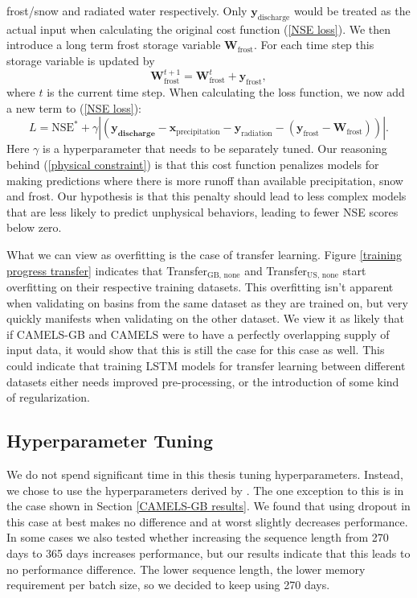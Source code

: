 frost/snow and radiated water respectively. Only $\bm{y}_\text{discharge}$ would 
be treated as the actual input when calculating the original cost function 
(\ref{NSE loss}). We then introduce a long term frost storage variable $\bm{W}_\text{frost}$.
For each time step this storage variable is updated by 
\begin{equation}
    \bm{W}_\text{frost}^{t+1} = \bm{W}_\text{frost}^t + \bm{y}_\text{frost},
\end{equation}
where $t$ is the current time step.
When calculating the loss function, we now add a new term to (\ref{NSE loss}):
\begin{equation}
    L = \text{NSE}^* + \gamma \left|(\bm{y_\text{discharge}} - \bm{x}_\text{precipitation} 
    - \bm{y}_\text{radiation} - (\bm{y}_\text{frost} - \bm{W}_\text{frost}))\right|
    \label{physical constraint}.
\end{equation}
Here $\gamma$ is a hyperparameter that needs to be separately tuned. Our reasoning 
behind (\ref{physical constraint}) is that this cost function penalizes models for 
making predictions where there is more runoff than available precipitation, 
snow and frost. Our hypothesis is that this penalty should lead to less complex 
models that are less likely to predict unphysical behaviors, leading to 
fewer NSE scores below zero. 

 What we can view as overfitting is the case of transfer learning. Figure 
 \ref{training progress transfer} indicates that Transfer$_\text{GB, none}$ 
 and Transfer$_\text{US, none}$ start overfitting on their respective training 
 datasets. This overfitting isn't apparent when validating on basins from the 
 same dataset as they are trained on, but very quickly manifests when validating 
 on the other dataset. We view it as likely that if CAMELS-GB and CAMELS were to 
 have a perfectly overlapping supply of input data, it would show that this is 
 still the case for this case as well. This could indicate that training LSTM models 
 for transfer learning between different datasets either needs improved pre-processing, 
 or the introduction of some kind of regularization. 
\subsection{Hyperparameter Tuning}
We do not spend significant time in this thesis tuning hyperparameters. Instead, 
we chose to use the hyperparameters derived by \citet{lstm_second_paper}. The one 
exception to this is in the case shown in Section \ref{CAMELS-GB results}. We found 
that using dropout in this case at best makes no difference and at worst slightly 
decreases performance. In some cases we also tested whether increasing the 
sequence length from 270 days to 365 days increases performance, but our results 
indicate that this leads to no performance difference. The lower sequence length, 
the lower memory requirement per batch size, so we decided to keep using 270 days. 

